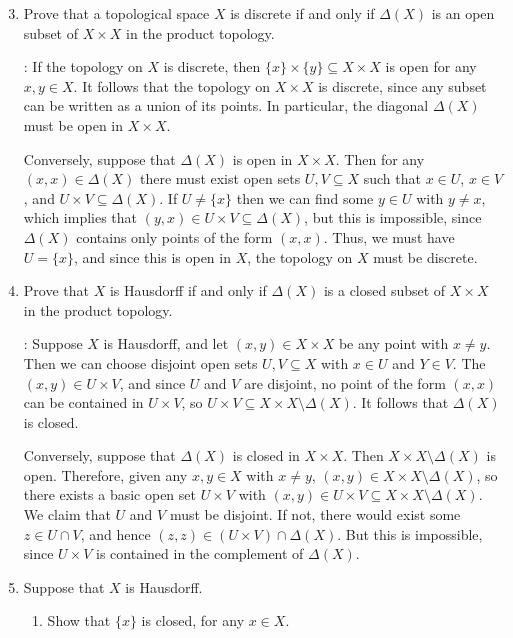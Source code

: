 \documentclass[letterpaper,12pt]{article}
\begin{document}
\begin{enumerate}
\setcounter{enumi}{2}
\item Prove that a topological space $X$ is discrete if and only if $\Delta(X)$ is an open subset of $X\times X$ in the product topology.

\bigskip

: If the topology on $X$ is discrete, then $\{x\}\times\{y\}\subseteq X\times X$ is open for any $x,y\in X$. It follows that the topology on $X\times X$ is discrete, since any subset can be written as a union of its points. In particular, the diagonal $\Delta(X)$ must be open in $X\times X$.

Conversely, suppose that $\Delta(X)$ is open in $X\times X$. Then for any $(x,x)\in \Delta(X)$ there must exist open sets $U,V\subseteq X$ such that $x\in U$, $x\in V$, and $U\times V\subseteq \Delta(X)$. If $U\neq \{x\}$ then we can find some $y\in U$ with $y\neq x$, which implies that $(y,x)\in U\times V\subseteq \Delta(X)$, but this is impossible, since $\Delta(X)$ contains only points of the form $(x,x)$. Thus, we must have $U=\{x\}$, and since this is open in $X$, the topology on $X$ must be discrete.

\item Prove that $X$ is Hausdorff if and only if $\Delta(X)$ is a closed subset of $X\times X$ in the product topology.

\bigskip

: Suppose $X$ is Hausdorff, and let $(x,y)\in X\times X$ be any point with $x\neq y$. Then we can choose disjoint open sets $U,V\subseteq X$ with $x\in U$ and $Y\in V$. The $(x,y)\in U\times V$, and since $U$ and $V$ are disjoint, no point of the form $(x,x)$ can be contained in $U\times V$, so $U\times V\subseteq X\times X\setminus \Delta(X)$. It follows that $\Delta(X)$ is closed.

Conversely, suppose that $\Delta(X)$ is closed in $X\times X$. Then $X\times X\setminus \Delta(X)$ is open. Therefore, given any $x,y\in X$ with $x\neq y$, $(x,y)\in X\times X\setminus \Delta(X)$, so there exists a basic open set $U\times V$ with $(x,y)\in U\times V\subseteq X\times X\setminus \Delta(X)$. We claim that $U$ and $V$ must be disjoint. If not, there would exist some $z\in U\cap V$, and hence $(z,z)\in (U\times V)\cap \Delta(X)$. But this is impossible, since $U\times V$ is contained in the complement of $\Delta(X)$.

\item Suppose that $X$ is Hausdorff.
\begin{enumerate}
 \item Show that $\{x\}$ is closed, for any $x\in X$.


\end{enumerate}
\end{enumerate}
\end{document}
